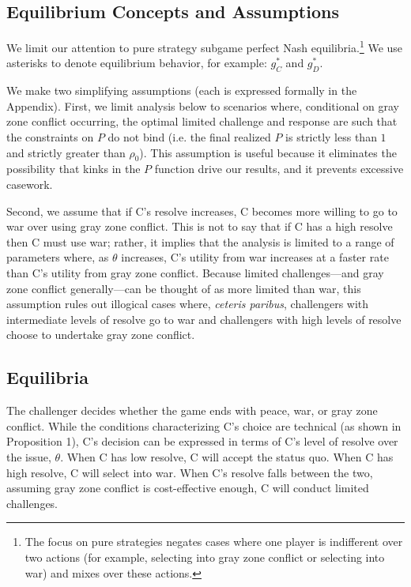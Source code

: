 \documentclass[bibtex, autowc]{apsr_submission}
\begin{document}
    \subsection{Equilibrium Concepts and Assumptions}
    We limit our attention to pure strategy subgame perfect Nash equilibria.\footnote{The focus on pure strategies negates cases where one player is indifferent over two actions (for example, selecting into gray zone conflict or selecting into war) and mixes over these actions.} We use asterisks to denote equilibrium behavior, for example: $g_{C}^{*}$ and $g_{D}^{*}$.
    
    We make two simplifying assumptions (each is expressed formally in the Appendix). First, we limit analysis below to scenarios where, conditional on gray zone conflict occurring, the optimal limited challenge and response are such that the constraints on $P$ do not bind (i.e. the final realized $P$ is strictly less than $1$ and strictly greater than $\rho_{0}$). This assumption is useful because it eliminates the possibility that kinks in the $P$ function drive our results, and it prevents excessive casework.
     
    Second, we assume that if C's resolve increases, C becomes more willing to go to war over using gray zone conflict. This is not to say that if C has a high resolve then C must use war; rather, it implies that the analysis is limited to a range of parameters where, as $\theta$ increases, C's utility from war increases at a faster rate than C's utility from gray zone conflict. Because limited challenges---and gray zone conflict generally---can be thought of as more limited than war, this assumption rules out illogical cases where, \textit{ceteris paribus}, challengers with intermediate levels of resolve go to war and challengers with high levels of resolve choose to undertake gray zone conflict.
    
    \subsection{Equilibria}
    The challenger decides whether the game ends with peace, war, or gray zone conflict. %
    While the conditions characterizing C's choice are technical (as shown in Proposition 1), C's decision can be expressed in terms of C's level of resolve over the issue, $\theta$. When C has low resolve, C will accept the status quo. When C has high resolve, C will select into war. When C's resolve falls between the two, assuming gray zone conflict is cost-effective enough, C will conduct limited challenges.
    
\end{document}
